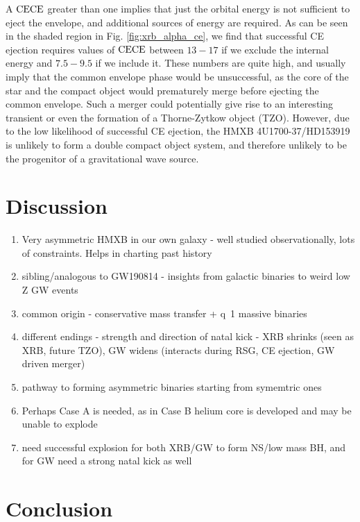 \documentclass[linenumbers,trackchanges,twocolumn]{aastex701}
\begin{document}
 A $\alpha_{\rm CE}$ greater than one implies that just the orbital energy is not sufficient to eject the envelope, and additional sources of energy are required. As can be seen in the shaded region in Fig. \ref{fig:xrb_alpha_ce}, we find that successful CE ejection requires values of $\alpha_{\rm CE}$ between $13-17$ if we exclude the internal energy and $7.5-9.5$ if we include it. These numbers are quite high, and usually imply that the common envelope phase would be unsuccessful, as the core of the star and the compact object would prematurely merge before ejecting the common envelope. Such a merger could potentially give rise to an interesting transient or even the formation of a Thorne-Zytkow object (TZO). However, due to the low likelihood of successful CE ejection, the HMXB 4U1700-37/HD153919 is unlikely to form a double compact object system, and therefore unlikely to be the progenitor of a gravitational wave source.

\section{Discussion} \label{sec:highlight}

\begin{enumerate}
    \item Very asymmetric HMXB in our own galaxy - well studied observationally, lots of constraints. Helps in charting past history
    \item sibling/analogous to GW190814 - insights from galactic binaries to weird low Z GW events
    \item common origin - conservative mass transfer + q~1 massive binaries
    \item different endings - strength and direction of natal kick - XRB shrinks (seen as XRB, future TZO), GW widens (interacts during RSG, CE ejection, GW driven merger)
    \item pathway to forming asymmetric binaries starting from symemtric ones
    \item Perhaps Case A is needed, as in Case B helium core is developed and may be unable to explode
    \item need successful explosion for both XRB/GW to form NS/low mass BH, and for GW need a strong natal kick as well
\end{enumerate}

\section{Conclusion} \label{sec:cite}
\end{document}
